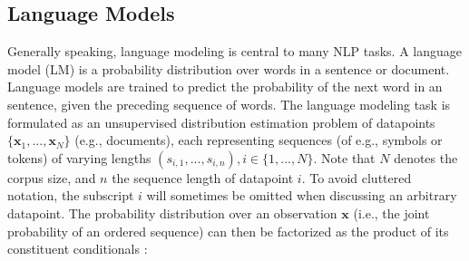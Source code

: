 
\subsection{Language Models}

Generally speaking, language modeling is central to many NLP tasks. A language model (LM) is a probability distribution over words in a sentence or document. Language models are trained to predict the probability of the next word in an sentence, given the preceding sequence of words. The language modeling task is formulated as an unsupervised distribution estimation problem of datapoints $\{\textbf{x}_1, ..., \textbf{x}_N\}$ (e.g., documents), each representing sequences (of e.g., symbols or tokens) of varying lengths $(s_{i, 1}, ..., s_{i, n}), i \in \{1, ..., N\}$. Note that $N$ denotes the corpus size, and $n$ the sequence length of datapoint $i$. To avoid cluttered notation, the subscript $i$ will sometimes be omitted when discussing an arbitrary datapoint. The probability distribution over an observation $\textbf{x}$  (i.e., the joint probability of an ordered sequence) can then be factorized as the product of its constituent conditionals \citep{radford2019language}:

